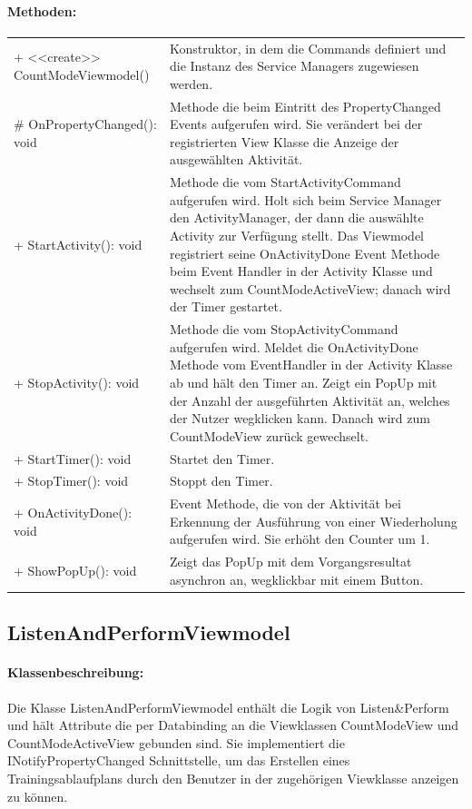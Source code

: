 \documentclass[a4paper,12pt]{article}
\begin{document}
\paragraph{Methoden:}
\begin{tabular}{p{7cm}p{10cm}}
+ <<create>> CountModeViewmodel() & Konstruktor, in dem die Commands definiert und die Instanz des Service Managers zugewiesen werden. \\
\# OnPropertyChanged(): void & Methode die beim Eintritt des PropertyChanged Events aufgerufen wird. Sie verändert bei der registrierten View Klasse die Anzeige der ausgewählten Aktivität. \\
+ StartActivity(): void & Methode die vom StartActivityCommand aufgerufen wird. Holt sich beim Service Manager den ActivityManager, der dann die auswählte Activity zur Verfügung stellt. Das Viewmodel registriert seine OnActivityDone Event Methode beim Event Handler in der Activity Klasse und wechselt zum CountModeActiveView; danach wird der Timer gestartet. \\
+ StopActivity(): void & Methode die vom StopActivityCommand aufgerufen wird. Meldet die OnActivityDone Methode vom EventHandler in der Activity Klasse ab und hält den Timer an. Zeigt ein PopUp mit der Anzahl der ausgeführten Aktivität an, welches der Nutzer wegklicken kann. Danach wird zum CountModeView zurück gewechselt. \\
+ StartTimer(): void & Startet den Timer. \\
+ StopTimer(): void & Stoppt den Timer. \\
+ OnActivityDone(): void & Event Methode, die von der Aktivität bei Erkennung der Ausführung von einer Wiederholung aufgerufen wird. Sie erhöht den Counter um 1. \\
+ ShowPopUp(): void & Zeigt das PopUp mit dem Vorgangsresultat asynchron an, wegklickbar mit einem Button. \\
\end{tabular}

\subsection{ListenAndPerformViewmodel}
\paragraph{Klassenbeschreibung:}
Die Klasse ListenAndPerformViewmodel enthält die Logik von Listen\&Perform und hält Attribute die per Databinding an die Viewklassen CountModeView und CountModeActiveView gebunden sind.  Sie implementiert die INotifyPropertyChanged Schnittstelle, um das Erstellen eines Trainingsablaufplans durch den Benutzer in der zugehörigen Viewklasse anzeigen zu können.
\end{document}
